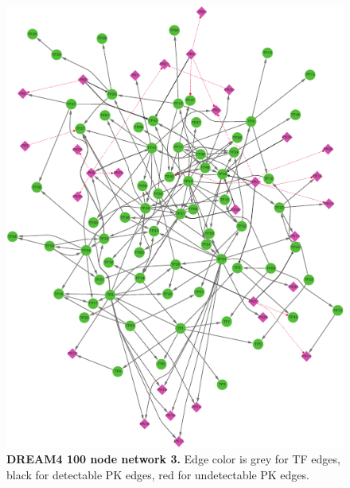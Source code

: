 \begin{figure}[ht]
    \centering
    \includegraphics[width=\textwidth]{appendices/fig/net_100_3.pdf}
    \caption{\textbf{DREAM4 100 node network 3.} Edge color is grey for TF edges, black for detectable PK edges, red for undetectable PK edges.}
    \label{fig:dream4_net100.3}
\end{figure}

